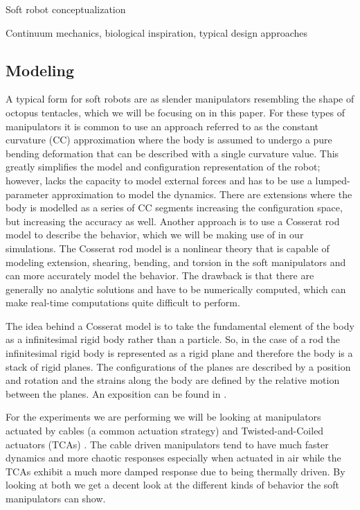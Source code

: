 \documentclass[letterpaper, 10 pt, conference]{ieeeconf}  %
\begin{document}
Soft robot conceptualization

Continuum mechanics, biological inspiration, typical design approaches

\subsection{Modeling}

A typical form for soft robots are as slender manipulators resembling the shape of octopus tentacles, which we will be focusing on in this paper. For these types of manipulators it is common to use an approach referred to as the constant curvature (CC) approximation where the body is assumed to undergo a pure bending deformation that can be described with a single curvature value. This greatly simplifies the model and configuration representation of the robot; however, lacks the capacity to model external forces and has to be use a lumped-parameter approximation to model the dynamics. There are extensions where the body is modelled as a series of CC segments increasing the configuration space, but increasing the accuracy as well. Another approach is to use a Cosserat rod model to describe the behavior, which we will be making use of in our simulations. The Cosserat rod model is a nonlinear theory that is capable of modeling extension, shearing, bending, and torsion in the soft manipulators and can more accurately model the behavior. The drawback is that there are generally no analytic solutions and have to be numerically computed, which can make real-time computations quite difficult to perform.

The idea behind a Cosserat model is to take the fundamental element of the body as a infinitesimal rigid body rather than a particle. So, in the case of a rod the infinitesimal rigid body is represented as a rigid plane and therefore the body is a stack of rigid planes. The configurations of the planes are described by a position and rotation and the strains along the body are defined by the relative motion between the planes. An exposition can be found in \cite{CDC}. 

For the experiments we are performing we will be looking at manipulators actuated by cables (a common actuation strategy) and Twisted-and-Coiled actuators (TCAs) \cite{tcaScience}. The cable driven manipulators tend to have much faster dynamics and more chaotic responses especially when actuated in air while the TCAs exhibit a much more damped response due to being thermally driven. By looking at both we get a decent look at the different kinds of behavior the soft manipulators can show.
\end{document}
